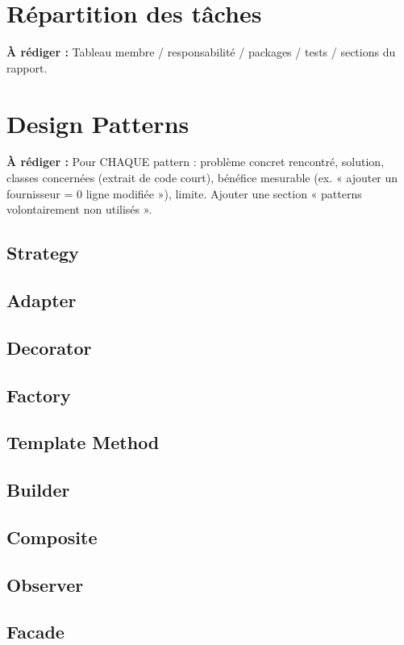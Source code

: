 \documentclass[11pt,a4paper]{report}
\newcommand{\todo}[1]{\par\noindent\colorbox{yellow!30}{\parbox{\dimexpr\linewidth-2\fboxsep}{\textbf{À rédiger :} #1}}\par}
\begin{document}
\chapter{Répartition des tâches}                         %
\todo{Tableau membre / responsabilité / packages / tests / sections du rapport.}

\chapter{Design Patterns}                                %
\todo{Pour CHAQUE pattern : problème concret rencontré, solution, classes concernées (extrait de code court), bénéfice mesurable (ex. « ajouter un fournisseur = 0 ligne modifiée »), limite. Ajouter une section « patterns volontairement non utilisés ».}
\section{Strategy}          %
\section{Adapter}           %
\section{Decorator}         %
\section{Factory}           %
\section{Template Method}   %
\section{Builder}           %
\section{Composite}         %
\section{Observer}          %
\section{Facade}            %
\end{document}

